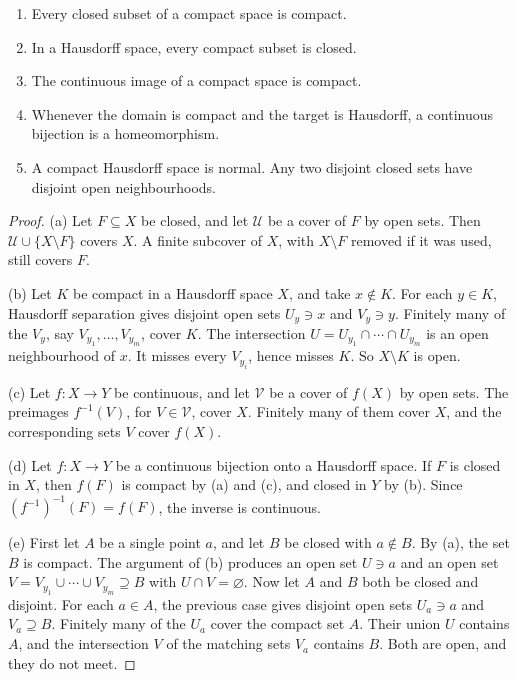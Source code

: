 \begin{proposition}\label{prop:compactbasic}
\begin{enumerate}[label=(\alph*)]
\item Every closed subset of a compact space is compact.
\item In a Hausdorff space, every compact subset is closed.
\item The continuous image of a compact space is compact.
\item Whenever the domain is compact and the target is Hausdorff, a continuous bijection is a homeomorphism.
\item A compact Hausdorff space is normal. Any two disjoint closed sets have disjoint open neighbourhoods.
\end{enumerate}
\end{proposition}
\begin{proof}
(a) Let $F\subseteq X$ be closed, and let $\mathcal U$ be a cover of $F$ by open sets. Then $\mathcal U\cup\{X\setminus F\}$ covers $X$. A finite subcover of $X$, with $X\setminus F$ removed if it was used, still covers $F$.

(b) Let $K$ be compact in a Hausdorff space $X$, and take $x\notin K$. For each $y\in K$, Hausdorff separation gives disjoint open sets $U_y\ni x$ and $V_y\ni y$. Finitely many of the $V_y$, say $V_{y_1},\dots,V_{y_m}$, cover $K$. The intersection $U=U_{y_1}\cap\cdots\cap U_{y_m}$ is an open neighbourhood of $x$. It misses every $V_{y_i}$, hence misses $K$. So $X\setminus K$ is open.

(c) Let $f:X\to Y$ be continuous, and let $\mathcal V$ be a cover of $f(X)$ by open sets. The preimages $f^{-1}(V)$, for $V\in\mathcal V$, cover $X$. Finitely many of them cover $X$, and the corresponding sets $V$ cover $f(X)$.

(d) Let $f:X\to Y$ be a continuous bijection onto a Hausdorff space. If $F$ is closed in $X$, then $f(F)$ is compact by (a) and (c), and closed in $Y$ by (b). Since $(f^{-1})^{-1}(F)=f(F)$, the inverse is continuous.

(e) First let $A$ be a single point $a$, and let $B$ be closed with $a\notin B$. By (a), the set $B$ is compact. The argument of (b) produces an open set $U\ni a$ and an open set $V=V_{y_1}\cup\cdots\cup V_{y_m}\supseteq B$ with $U\cap V=\varnothing$. Now let $A$ and $B$ both be closed and disjoint. For each $a\in A$, the previous case gives disjoint open sets $U_a\ni a$ and $V_a\supseteq B$. Finitely many of the $U_a$ cover the compact set $A$. Their union $U$ contains $A$, and the intersection $V$ of the matching sets $V_a$ contains $B$. Both are open, and they do not meet.
\end{proof}

